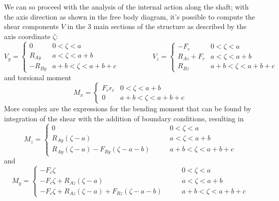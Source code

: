 	We can so proceed with the analysis of the internal action along the shaft; with the axis direction as shown in the free body diagram, it's possible to compute the shear components $V$ in the 3 main sections of the structure as described by the axis coordinate $\zeta$:
	\[ V_y = \begin{cases}
		0 & 0 < \zeta < a \\ R_{Ay} & a < \zeta < a+b \\
		-R_{By} & a+b < \zeta < a + b+ c
	\end{cases} \hspace{2cm} V_z = \begin{cases}
		-F_c & 0 < \zeta < a \\ R_{Az}+F_c & a < \zeta < a+b \\
		 R_{Bz}& a+b < \zeta < a + b+ c
	\end{cases}  \]
	and torsional moment
	\[ M_x = \begin{cases}
		F_c r_c & 0 < \zeta < a+b \\ 0 & a+b < \zeta < a+b+c
	\end{cases} \]
	More complex are the expressions for the bending moment that can be found by integration of the shear with the addition of boundary conditions, resulting in
	\[ M_z = \begin{cases}
		0 & 0 < \zeta < a \\ 
		R_{Ay} (\zeta-a) & a < \zeta < a+b \\
		R_{Ay} (\zeta-a) - F_{Ry} (\zeta-a-b) \qquad & a+b < \zeta < a + b+ c
	\end{cases} \] and \[ M_y = \begin{cases}
		-F_c \zeta & 0 < \zeta < a \\ -F_c\zeta + R_{Az}(\zeta-a) & a < \zeta < a+b \\
		-F_c\zeta + R_{Az}(\zeta-a) + F_{Rz}(\zeta-a-b) \qquad & a+b < \zeta < a + b+ c
	\end{cases}  \]
	
